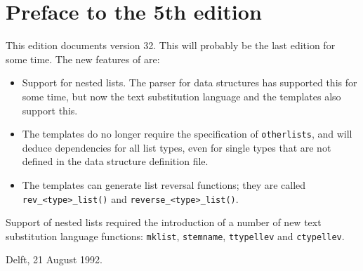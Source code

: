 \section{Preface to the 5th edition}
This edition documents {\Tm} version 32.
This will probably be the last edition for some time. The new features
of {\Tm} are:
\begin{itemize}
\item Support for nested lists. The parser for data structures has
supported this for some time, but now the text substitution language
and the {\C} templates also support this.
\item The {\C} templates do no longer require the specification of
{\tt otherlists}, and will deduce dependencies for all list types,
even for single types that are not defined in the data structure definition
file.
\item The {\C} templates can generate list reversal functions; they
      are called \verb+rev_<type>_list()+ and \verb+reverse_<type>_list()+.
\end{itemize}
Support of nested lists required the introduction of a number of new
{\Tm} text substitution language functions: \verb+mklist+, \verb+stemname+,
\verb+ttypellev+ and \verb+ctypellev+.
\begin{flushright}
Delft, 21 August 1992.
\end{flushright}

